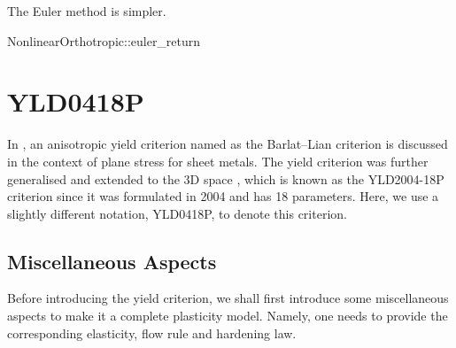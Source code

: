 The Euler method is simpler.
\begin{cppcode}
NonlinearOrthotropic::euler_return
\end{cppcode}
\section{YLD0418P}
In \cite{SouzaNeto2008}, an anisotropic yield criterion named as the Barlat--Lian criterion \cite{Barlat1989} is discussed in the context of plane stress for sheet metals.
The yield criterion was further generalised \cite{Barlat2003} and extended to the 3D space \cite{Barlat2005}, which is known as the YLD2004-18P criterion since it was formulated in 2004 and has 18 parameters.
Here, we use a slightly different notation, YLD0418P, to denote this criterion.
\subsection{Miscellaneous Aspects}
Before introducing the yield criterion, we shall first introduce some miscellaneous aspects to make it a complete plasticity model.
Namely, one needs to provide the corresponding elasticity, flow rule and hardening law.

